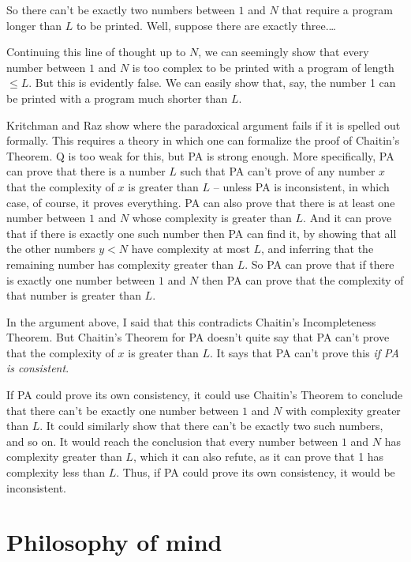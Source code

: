 So there can't be exactly two numbers between $1$ and $N$
that require a program longer than $L$ to be printed.
Well, suppose there are exactly three.\ldots

Continuing this line of thought up to $N$,
we can seemingly show that every number between $1$ and $N$
is too complex to be printed with a program of length $\leq L$.
But this is evidently false.
We can easily show that, say, the number 1 can be printed with a program much shorter than $L$.

Kritchman and Raz show where the paradoxical argument fails if it is spelled out formally.
This requires a theory in which one can formalize the proof of Chaitin's Theorem.
Q is too weak for this,
but PA is strong enough.
More specifically,
PA can prove that there is a number $L$ such that PA can't prove
of any number $x$
that the complexity of $x$ is greater than $L$ --
unless PA is inconsistent,
in which case, of course, it proves everything.
PA can also prove that there is at least one number between $1$ and $N$
whose complexity is greater than $L$.
And it can prove that if there is exactly one such number
then PA can find it,
by showing that all the other numbers $y < N$ have complexity at most $L$,
and inferring that the remaining number has complexity greater than $L$.
So PA can prove that if there is exactly one number between $1$ and $N$
then PA can prove that the complexity of that number is greater than $L$.

In the argument above,
I said that this contradicts Chaitin's Incompleteness Theorem.
But Chaitin's Theorem for PA doesn't quite say that
PA can't prove that the complexity of $x$ is greater than $L$.
It says that PA can't prove this \emph{if PA is consistent}.

If PA could prove its own consistency,
it could use Chaitin's Theorem to conclude that there can't be exactly one number between $1$ and $N$
with complexity greater than $L$.
It could similarly show that there can't be exactly two such numbers,
and so on.
It would reach the conclusion that
every number between $1$ and $N$ has complexity greater than $L$,
which it can also refute,
as it can prove that 1 has complexity less than $L$. 
Thus,
if PA could prove its own consistency,
it would be inconsistent.


\section{Philosophy of mind}

